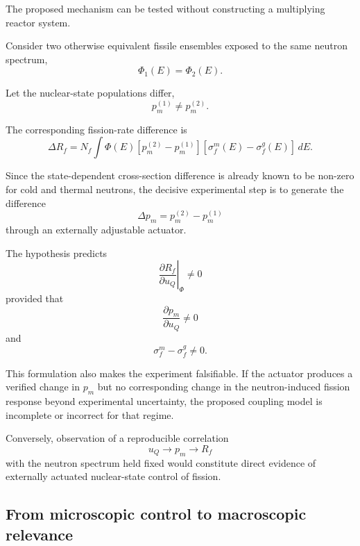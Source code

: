 The proposed mechanism can be tested without constructing a multiplying reactor system.

Consider two otherwise equivalent fissile ensembles exposed to the same neutron spectrum,
\begin{equation}
\Phi_1(E)=\Phi_2(E).
\end{equation}

Let the nuclear-state populations differ,
\begin{equation}
p_m^{(1)}\neq p_m^{(2)}.
\end{equation}

The corresponding fission-rate difference is
\begin{equation}
\Delta R_f
=
N_f
\int
\Phi(E)
\left[
p_m^{(2)}-p_m^{(1)}
\right]
\left[
\sigma_f^m(E)-\sigma_f^g(E)
\right]
\,dE.
\end{equation}

Since the state-dependent cross-section difference is already known to be non-zero for cold and thermal neutrons, the decisive experimental step is to generate the difference
\begin{equation}
\Delta p_m=p_m^{(2)}-p_m^{(1)}
\end{equation}
through an externally adjustable actuator.

The hypothesis predicts
\begin{equation}
\boxed{
\left.
\frac{\partial R_f}{\partial u_Q}
\right|_{\Phi}
\neq0
}
\end{equation}
provided that
\begin{equation}
\frac{\partial p_m}{\partial u_Q}\neq0
\end{equation}
and
\begin{equation}
\sigma_f^m-\sigma_f^g\neq0.
\end{equation}

This formulation also makes the experiment falsifiable. If the actuator produces a verified change in $p_m$ but no corresponding change in the neutron-induced fission response beyond experimental uncertainty, the proposed coupling model is incomplete or incorrect for that regime.

Conversely, observation of a reproducible correlation
\begin{equation}
u_Q\rightarrow p_m\rightarrow R_f
\end{equation}
with the neutron spectrum held fixed would constitute direct evidence of externally actuated nuclear-state control of fission.

\subsection{From microscopic control to macroscopic relevance}

